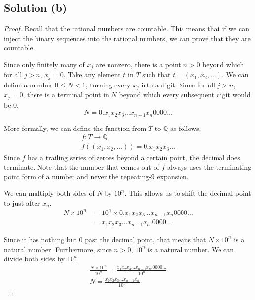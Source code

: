\documentclass[11pt]{article}
\begin{document}
    \subsection{Solution (b)}
    \begin{proof}
        Recall that the rational numbers are countable.
        This means that if we can inject the binary sequences into the rational numbers, we can prove that they are countable.
        
        Since only finitely many of $x_j$ are nonzero, there is a point $n > 0$ beyond which for all $j > n$, $x_j = 0$.
        Take any element $t$ in $T$ such that $t = (x_1, x_2, \dots)$.
        We can define a number $0 \leq N < 1$, turning every $x_j$ into a digit.
        Since for all $j > n$, $x_j = 0$, there is a terminal point in $N$ beyond which every subsequent digit would be $0$.
        \begin{equation}
            N = 0.x_1 x_2 x_3 \dots x_{n - 1} x_n 0000\dots
        \end{equation}

        More formally, we can define the function from $T$ to $\mathbb{Q}$ as follows.
        \begin{gather}
            f: T \to \mathbb{Q}\\
            f((x_1, x_2, \dots)) = 0.x_1 x_2 x_3 \dots
        \end{gather}
        Since $f$ has a trailing series of zeroes beyond a certain point, the decimal does terminate.
        Note that the number that comes out of $f$ always uses the terminating point form of a number and never the repeating-$9$ expansion.

        We can multiply both sides of $N$ by $10^n$.
        This allows us to shift the decimal point to just after $x_n$.
        \begin{align}
            N \times 10^n   &=  10^n \times 0.x_1 x_2 x_3 \dots x_{n - 1} x_n 0000\dots\\
                &=  x_1 x_2 x_3 \dots x_{n - 1} x_n .0000\dots
        \end{align}
        
        Since it has nothing but $0$ past the decimal point, that means that $N \times 10^n$ is a natural number.
        Furthermore, since $n > 0$, $10^n$ is a natural number.
        We can divide both sides by $10^n$.
        \begin{gather}
            \frac{N \times 10^n}{10^n} = \frac{x_1 x_2 x_3 \dots x_{n - 1} x_n .0000\dots}{10^n}\\
            N   =   \frac{x_1 x_2 x_3 \dots x_{n - 1} x_n}{10^n}
        \end{gather}


\end{proof}
\end{document}
